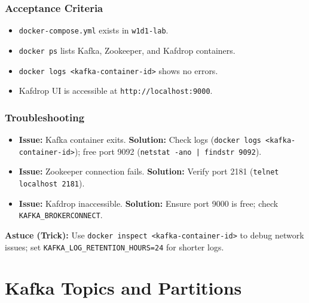 \documentclass[12pt,a4paper]{report}
\begin{document}
\subsection{Acceptance Criteria}
\begin{itemize}
    \item \texttt{docker-compose.yml} exists in \texttt{w1d1-lab}.
    \item \texttt{docker ps} lists Kafka, Zookeeper, and Kafdrop containers.
    \item \texttt{docker logs <kafka-container-id>} shows no errors.
    \item Kafdrop UI is accessible at \texttt{http://localhost:9000}.
\end{itemize}

\subsection{Troubleshooting}
\begin{itemize}
    \item \textbf{Issue:} Kafka container exits.
      \textbf{Solution:} Check logs (\texttt{docker logs <kafka-container-id>}); free port 9092 (\texttt{netstat -ano | findstr 9092}).
    \item \textbf{Issue:} Zookeeper connection fails.
      \textbf{Solution:} Verify port 2181 (\texttt{telnet localhost 2181}).
    \item \textbf{Issue:} Kafdrop inaccessible.
      \textbf{Solution:} Ensure port 9000 is free; check \texttt{KAFKA_BROKERCONNECT}.
\end{itemize}

\begin{framed}
\textbf{Astuce (Trick):} Use \texttt{docker inspect <kafka-container-id>} to debug network issues; set \texttt{KAFKA_LOG_RETENTION_HOURS=24} for shorter logs.
\end{framed}

\chapter{Kafka Topics and Partitions}
\end{document}
